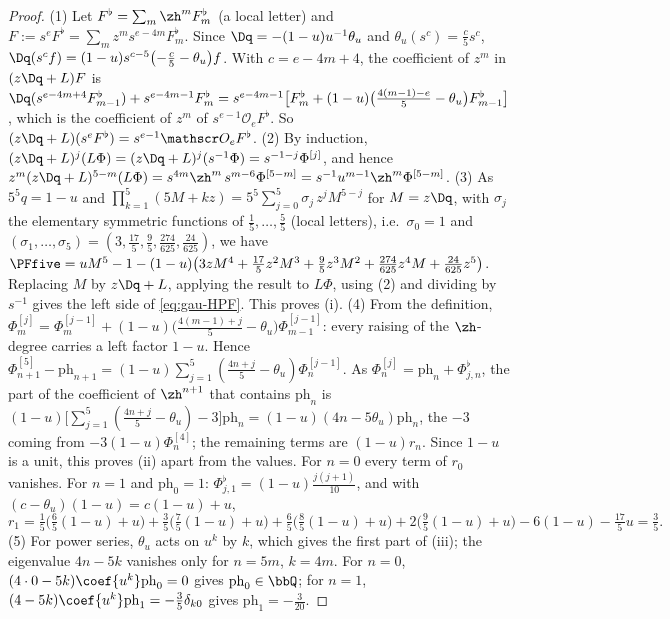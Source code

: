 \begin{proof}
(1) Let $F^\flat=\sum_m\zh^mF^\flat_m$ (a local letter) and $F:=s^eF^\flat=\sum_mz^ms^{e-4m}F^\flat_m$. Since $\Dq=-(1-u)u^{-1}\theta_u$ and $\theta_u(s^c)=\frac c5s^c$, $\Dq(s^cf)=(1-u)s^{c-5}\bigl(-\frac c5-\theta_u\bigr)f$. With $c=e-4m+4$, the coefficient of $z^m$ in $(z\Dq+L)F$ is $\Dq(s^{e-4m+4}F^\flat_{m-1})+s^{e-4m-1}F^\flat_m=s^{e-4m-1}\bigl[F^\flat_m+(1-u)\bigl(\frac{4(m-1)-e}5-\theta_u\bigr)F^\flat_{m-1}\bigr]$, which is the coefficient of $z^m$ of $s^{e-1}\mathscr O_eF^\flat$. So $(z\Dq+L)(s^eF^\flat)=s^{e-1}\mathscr O_eF^\flat$.
(2) By induction, $(z\Dq+L)^j(L\Phi)=(z\Dq+L)^j(s^{-1}\Phi)=s^{-1-j}\Phi^{[j]}$, and hence $z^m(z\Dq+L)^{5-m}(L\Phi)=s^{4m}\zh^m\,s^{m-6}\Phi^{[5-m]}=s^{-1}u^{m-1}\zh^m\Phi^{[5-m]}$.
(3) As $5^5q=1-u$ and $\prod_{k=1}^5(5M+kz)=5^5\sum_{j=0}^5\sigma_j\,z^jM^{5-j}$ for $M=z\Dq$, with $\sigma_j$ the elementary symmetric functions of $\frac15,\dots,\frac55$ (local letters), i.e.\ $\sigma_0=1$ and $(\sigma_1,\dots,\sigma_5)=(3,\frac{17}5,\frac95,\frac{274}{625},\frac{24}{625})$, we have $\PFfive=uM^5-1-(1-u)\bigl(3zM^4+\frac{17}5z^2M^3+\frac95z^3M^2+\frac{274}{625}z^4M+\frac{24}{625}z^5\bigr)$. Replacing $M$ by $z\Dq+L$, applying the result to $L\Phi$, using (2) and dividing by $s^{-1}$ gives the left side of \eqref{eq:gau-HPF}. This proves (i).
(4) From the definition, $\Phi^{[j]}_m=\Phi^{[j-1]}_m+(1-u)\bigl(\frac{4(m-1)+j}5-\theta_u\bigr)\Phi^{[j-1]}_{m-1}$: every raising of the $\zh$-degree carries a left factor $1-u$. Hence $\Phi^{[5]}_{n+1}-\mathrm{ph}_{n+1}=(1-u)\sum_{j=1}^5(\frac{4n+j}5-\theta_u)\Phi^{[j-1]}_n$. As $\Phi^{[j]}_n=\mathrm{ph}_n+\Phi^\flat_{j,n}$, the part of the coefficient of $\zh^{n+1}$ that contains $\mathrm{ph}_n$ is $(1-u)\bigl[\sum_{j=1}^5(\frac{4n+j}5-\theta_u)-3\bigr]\mathrm{ph}_n=(1-u)(4n-5\theta_u)\mathrm{ph}_n$, the $-3$ coming from $-3(1-u)\Phi^{[4]}_n$; the remaining terms are $(1-u)r_n$. Since $1-u$ is a unit, this proves (ii) apart from the values. For $n=0$ every term of $r_0$ vanishes. For $n=1$ and $\mathrm{ph}_0=1$: $\Phi^\flat_{j,1}=(1-u)\frac{j(j+1)}{10}$, and with $(c-\theta_u)(1-u)=c(1-u)+u$,
\[
r_1=\tfrac15\bigl(\tfrac65(1-u)+u\bigr)+\tfrac35\bigl(\tfrac75(1-u)+u\bigr)+\tfrac65\bigl(\tfrac85(1-u)+u\bigr)+2\bigl(\tfrac95(1-u)+u\bigr)-6(1-u)-\tfrac{17}5u=\tfrac35 .
\]
(5) For power series, $\theta_u$ acts on $u^k$ by $k$, which gives the first part of (iii); the eigenvalue $4n-5k$ vanishes only for $n=5m$, $k=4m$. For $n=0$, $(4\cdot0-5k)\coef{u^k}\mathrm{ph}_0=0$ gives $\mathrm{ph}_0\in\bbQ$; for $n=1$, $(4-5k)\coef{u^k}\mathrm{ph}_1=-\frac35\delta_{k0}$ gives $\mathrm{ph}_1=-\frac3{20}$.
\end{proof}

